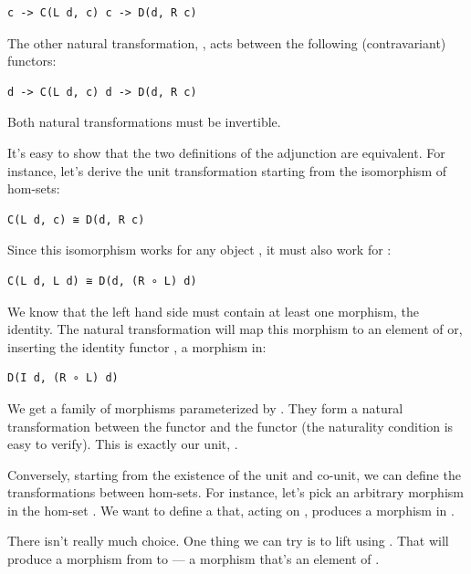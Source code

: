\begin{verbatim}
c -> C(L d, c) c -> D(d, R c)
\end{verbatim}

The other natural transformation, , acts between the following
(contravariant) functors:

\begin{verbatim}
d -> C(L d, c) d -> D(d, R c)
\end{verbatim}

Both natural transformations must be invertible.

It's easy to show that the two definitions of the adjunction are
equivalent. For instance, let's derive the unit transformation starting
from the isomorphism of hom-sets:

\begin{verbatim}
C(L d, c) ≅ D(d, R c)
\end{verbatim}

Since this isomorphism works for any object , it must also
work for :

\begin{verbatim}
C(L d, L d) ≅ D(d, (R ∘ L) d)
\end{verbatim}

We know that the left hand side must contain at least one morphism, the
identity. The natural transformation will map this morphism to an
element of  or, inserting the identity
functor , a morphism in:

\begin{verbatim}
D(I d, (R ∘ L) d)
\end{verbatim}

We get a family of morphisms parameterized by . They form a
natural transformation between the functor  and the functor
 (the naturality condition is easy to verify). This is
exactly our unit, .

Conversely, starting from the existence of the unit and co-unit, we can
define the transformations between hom-sets. For instance, let's pick an
arbitrary morphism  in the hom-set . We
want to define a  that, acting on , produces a
morphism in .

There isn't really much choice. One thing we can try is to lift
 using . That will produce a morphism 
from  to  --- a morphism that's an
element of .

